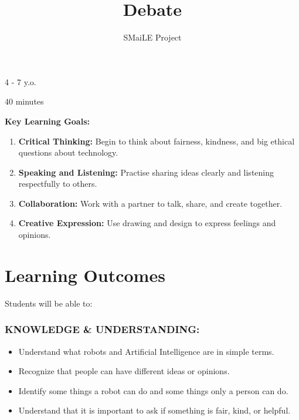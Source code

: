\documentclass[11pt, a4paper]{article}
\begin{document}
\title{\textbf{\color{SmailePurple}Debate}}
\author{SMaiLE Project}
\date{}
\maketitle
\thispagestyle{plain}

\begin{keyinfobox}
    \begin{description}[leftmargin=*, labelindent=0pt]
        \item[\bfseries\color{SmailePurple} Target Group:] 4 - 7 y.o.
        \item[\bfseries\color{SmailePurple} Duration:] 40 minutes
    \end{description}
    \textbf{Key Learning Goals:}
    \begin{enumerate}
        \item \textbf{Critical Thinking:} Begin to think about fairness, kindness, and big ethical questions about technology.
        \item \textbf{Speaking and Listening:} Practise sharing ideas clearly and listening respectfully to others.
        \item \textbf{Collaboration:} Work with a partner to talk, share, and create together.
        \item \textbf{Creative Expression:} Use drawing and design to express feelings and opinions.
    \end{enumerate}
\end{keyinfobox}

\section*{Learning Outcomes}
Students will be able to:

\subsubsection*{KNOWLEDGE \& UNDERSTANDING:}
\begin{itemize}
    \item Understand what robots and Artificial Intelligence are in simple terms.
    \item Recognize that people can have different ideas or opinions.
    \item Identify some things a robot can do and some things only a person can do.
    \item Understand that it is important to ask if something is fair, kind, or helpful.
\end{itemize}
\end{document}
